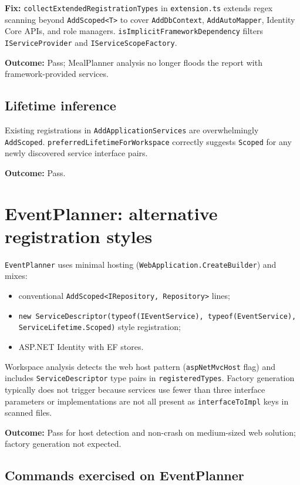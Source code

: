 \textbf{Fix:} \texttt{collectExtendedRegistrationTypes} in \texttt{extension.ts} extends regex scanning beyond \texttt{AddScoped<T>} to cover \texttt{AddDbContext}, \texttt{AddAutoMapper}, Identity Core APIs, and role managers. \texttt{isImplicitFrameworkDependency} filters \texttt{IServiceProvider} and \texttt{IServiceScopeFactory}.

\textbf{Outcome:} Pass; MealPlanner analysis no longer floods the report with framework-provided services.

\subsection{Lifetime inference}

Existing registrations in \texttt{AddApplicationServices} are overwhelmingly \texttt{AddScoped}. \texttt{preferredLifetimeForWorkspace} correctly suggests \texttt{Scoped} for any newly discovered service interface pairs.

\textbf{Outcome:} Pass.

\section{EventPlanner: alternative registration styles}
\label{chap5:eventplanner}

\texttt{EventPlanner} uses minimal hosting (\texttt{WebApplication.CreateBuilder}) and mixes:
\begin{itemize}
	\item conventional \texttt{AddScoped<IRepository, Repository>} lines;
	\item \texttt{new ServiceDescriptor(typeof(IEventService), typeof(EventService), ServiceLifetime.Scoped)} style registration;
	\item ASP.NET Identity with EF stores.
\end{itemize}

Workspace analysis detects the web host pattern (\texttt{aspNetMvcHost} flag) and includes \texttt{ServiceDescriptor} type pairs in \texttt{registeredTypes}. Factory generation typically does not trigger because services use fewer than three interface parameters or implementations are not all present as \texttt{interfaceToImpl} keys in scanned files.

\textbf{Outcome:} Pass for host detection and non-crash on medium-sized web solution; factory generation not expected.

\subsection{Commands exercised on EventPlanner}


